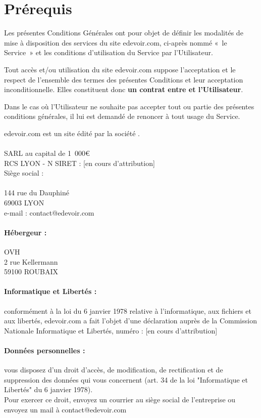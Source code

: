 \section{Prérequis}

Les présentes Conditions Générales ont pour objet de définir les modalités de mise à disposition des services du site edevoir.com, ci-après nommé «~le Service~» et les conditions d'utilisation du Service par l'Utilisateur.

Tout accès et/ou utilisation du site edevoir.com suppose l'acceptation et le respect de l'ensemble des termes des présentes Conditions et leur acceptation inconditionnelle. Elles constituent donc \textbf{un contrat entre \eDevoir et l'Utilisateur}.

Dans le cas où l'Utilisateur ne souhaite pas accepter tout ou partie des présentes conditions générales, il lui est demandé de renoncer à tout usage du Service.

edevoir.com est un site édité par la société \textbf{\eDevoir}.

\paragraph*{\eDevoir}
SARL au capital de 1~000\euro\\
RCS LYON - N SIRET : [en cours d'attribution]\\
Siège social :\\
\eDevoir\\
144 rue du Dauphiné\\
69003 LYON\\
e-mail : contact@edevoir.com

\paragraph*{Hébergeur :}
OVH\\
2 rue Kellermann\\
59100 ROUBAIX

\paragraph*{Informatique et Libertés :}
conformément à la loi du 6 janvier 1978 relative à l'informatique, aux fichiers et aux libertés, edevoir.com a fait l'objet d'une déclaration auprès de la Commission Nationale Informatique et Libertés, numéro : [en cours d'attribution]

\paragraph*{Données personnelles :}
vous disposez d'un droit d'accès, de modification, de rectification et de suppression des données qui vous concernent (art. 34 de la loi "Informatique et Libertés" du 6 janvier 1978).\\
Pour exercer ce droit, envoyez un courrier au siège social de l'entreprise ou envoyez un mail à contact@edevoir.com


